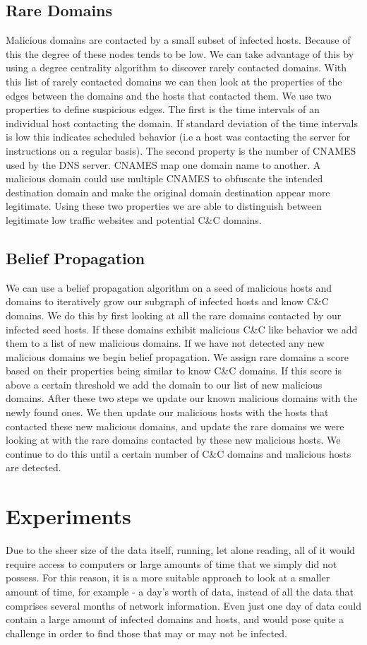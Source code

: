 \documentclass{article} %
\begin{document}
\subsection{Rare Domains}
Malicious domains are contacted by a small subset of infected hosts. Because of this the degree of these nodes tends to be low. We can take advantage of this by using a degree centrality algorithm to discover rarely contacted domains. With this list of rarely contacted domains we can then look at the properties of the edges between the domains and the hosts that contacted them. We use two properties to define suspicious edges. The first is the time intervals of an individual host contacting the domain. If standard deviation of the time intervals is low this indicates scheduled behavior (i.e a host was contacting the server for instructions on a regular basis). The second property is the number of CNAMES used by the DNS server. CNAMES map one domain name to another. A malicious domain could use multiple CNAMES to obfuscate the intended destination domain and make the original domain destination appear more legitimate. Using these two properties we are able to distinguish between legitimate low traffic websites and potential C\&C domains.

\subsection{Belief Propagation}
We can use a belief propagation algorithm on a seed of malicious hosts and domains to iteratively grow our subgraph of infected hosts and know C\&C domains. We do this by first looking at all the rare domains contacted by our infected seed hosts. If these domains exhibit malicious C\&C like behavior we add them to a list of new malicious domains. If we have not detected any new malicious domains we begin belief propagation. We assign rare domains a score based on their properties being similar to know C\&C domains. If this score is above a certain threshold we add the domain to our list of new malicious domains. After these two steps we update our known malicious domains with the newly found ones. We then update our malicious hosts with the hosts that contacted these new malicious domains, and update the rare domains we were looking at with the rare domains contacted by these new malicious hosts. We continue to do this until a certain number of C\&C domains and malicious hosts are detected.

\section{Experiments}
\label{exp}
Due to the sheer size of the data itself, running, let alone reading, all of it would require access to computers or large amounts of time that we simply did not possess. For this reason, it is a more suitable approach to 
look at a smaller amount of time, for example - a day's worth of data, instead of all the data that comprises several months of network information. Even just one day of data could contain a large amount of infected domains 
and hosts, and would pose quite a challenge in order to find those that may or may not be infected.
\end{document}
